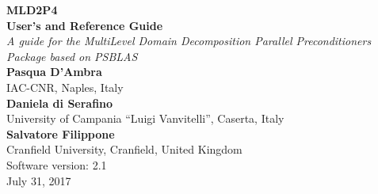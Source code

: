 \documentclass[a4paper,twoside,11pt]{article}
\begin{document}
{\LARGE\bfseries MLD2P4\\[.8ex] User's and Reference Guide}\\[\baselineskip]
\emph{\large A guide for the MultiLevel Domain Decomposition 
Parallel Preconditioners Package
based on PSBLAS}\\[3ex]
{\large\bfseries Pasqua D'Ambra}\\
\large IAC-CNR, Naples, Italy\\[3ex]
{\large\bfseries Daniela di Serafino}\\
\large University of Campania ``Luigi Vanvitelli'', Caserta, Italy\\[3ex]
{\large\bfseries Salvatore Filippone} \\
\large Cranfield University, Cranfield, United Kingdom
\\[10ex]
Software version: 2.1\\
 July 31, 2017
\clearpage
\ \\
\thispagestyle{empty}
\clearpage

\setcounter{page}{1}    %


\cleardoublepage

\begingroup
  \renewcommand*{\thepage}{toc}
  \tableofcontents
\endgroup  
\cleardoublepage

\setcounter{page}{1}    %









\cleardoublepage
\appendix

\cleardoublepage

\end{document}
